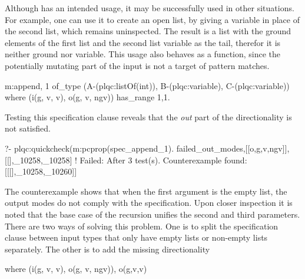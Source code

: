 Although  has an intended usage, it may be successfully
used in other situations.
%
For example, one can use it to create an open list, by giving a variable
in place of the second list, which remains uninspected.
%
The result is a list with the ground elements of the first list and the
second list variable as the tail, therefor it is neither ground nor
variable.
%
This usage also behaves as a function, since the potentially mutating
part of the input is not a target of pattern matches.
%
\begin{yapcode}
 {m:append, 1} of_type
     (A-(plqc:listOf(int)), B-(plqc:variable), C-(plqc:variable))
   where (i(g, v, v), o(g, v, ngv))  has_range {1,1}.
\end{yapcode}
%
Testing this specification clause reveals that the \emph{out} part of
the directionality is not satisfied.
\begin{yapcode}
  ?- plqc:quickcheck(m:pcprop(spec_append_1).
 {failed_out_modes,[[o,g,v,ngv]], [[],_10258,_10258]}
 !
 Failed: After 3 test(s).
 Counterexample found: [[[],_10258,_10260]] 
\end{yapcode}
%
The counterexample shows that when the first argument is the empty
list, %
the output modes do not comply with
the specification.
%
Upon closer inspection it is noted that the base case of the recursion
unifies the second and third parameters.
%
There are two %
ways of solving this problem.
%
One is to split the specification clause between input types that only
have empty lists or non-empty lists separately.
%
The other is to add the missing directionality
%
%
\begin{yapcode}
   where (i(g, v, v), o(g, v, ngv)), o(g,v,v)
\end{yapcode}



